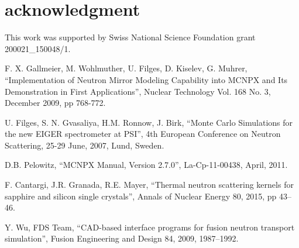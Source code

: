 \documentclass[a4paper,
              ]{jacow}
\begin{document}
\section{acknowledgment}

This work was supported by Swiss National Science Foundation grant 200021\_150048/1.

\begin{thebibliography}{9}   %

  F. X. Gallmeier, M. Wohlmuther, U. Filges, D. Kiselev, G. Muhrer,
  ``Implementation of Neutron Mirror Modeling Capability into MCNPX and Its Demonstration in First Applications'',
  Nuclear Technology Vol. 168 No. 3, December 2009, pp 768-772. 

  U. Filges, S. N. Gvasaliya, H.M. Ronnow, J. Birk,
  ``Monte Carlo Simulations for the new EIGER spectrometer at PSI'',
  4th European Conference on Neutron Scattering, 25-29 June, 2007, Lund, Sweden. 

   D.B. Pelowitz,
   ``MCNPX Manual, Version 2.7.0'',
   La-Cp-11-00438, April, 2011.

  F. Cantargi, J.R. Granada, R.E. Mayer, 
  ``Thermal neutron scattering kernels for sapphire and silicon single crystals'', 
  Annals of Nuclear Energy 80, 2015, pp 43–46.  

  Y. Wu, FDS Team, 
  ``CAD-based interface programs for fusion neutron transport simulation'', 
  Fusion Engineering and Design 84, 2009, 1987–1992. \\

\end{thebibliography}
\end{document}
